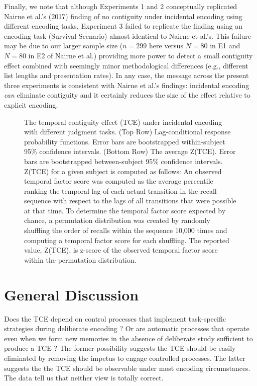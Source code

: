 \documentclass[jou,natbib,floatsintext]{apa6} %
\begin{document}
Finally, we note that although Experiments 1 and 2 conceptually replicated Nairne et al.'s (2017) finding of no contiguity under incidental encoding using different encoding tasks, Experiment 3 failed to replicate the finding using an encoding task (Survival Scenario) almost identical to Nairne et al.'s. This failure may be due to our larger sample size ($n=299$ here versus $N=80$ in E1 and $N=80$ in E2 of Nairne et al.) providing more power to detect a small contiguity effect combined with seemingly minor methodological differences (e.g., different list lengths and presentation rates). In any case, the message across the present three experiments is consistent with Nairne et al.'s findings: incidental encoding \emph{can} eliminate contiguity and it certainly reduces the size of the effect relative to explicit encoding. 

\begin{figure*}%
\caption{The temporal contiguity effect (TCE) under incidental encoding with different judgment tasks. (Top Row) Lag-conditional response probability functions. Error bars are bootstrapped within-subject 95\% confidence intervals. (Bottom Row) The average Z(TCE).  Error bars are bootstrapped between-subject 95\% confidence intervals. Z(TCE) for a given subject is computed as follows: An observed temporal factor score was computed as the average percentile ranking the temporal lag of each actual transition in the recall sequence with respect to the lags of all transitions that were possible at that time. To determine the temporal factor score expected by chance, a permutation distribution was created by randomly shuffling the order of recalls within the sequence 10,000 times and computing a temporal factor score for each shuffling. The reported value, Z(TCE), is z-score of the observed temporal factor score within the permutation distribution.}
\label{E3}
\end{figure*}









\section{General Discussion}
Does the TCE depend on control processes that implement task-specific strategies during deliberate encoding \citep{Hint16}? Or are automatic processes that operate even when we form new memories in the absence of deliberate study sufficient to produce a TCE \citep{HealKaha17}? The former possibility suggests the TCE should be easily eliminated by removing the impetus to engage controlled processes. The latter suggests the the TCE should be observable under most encoding circumstances. The data tell us that neither view is totally correct.
\end{document}
